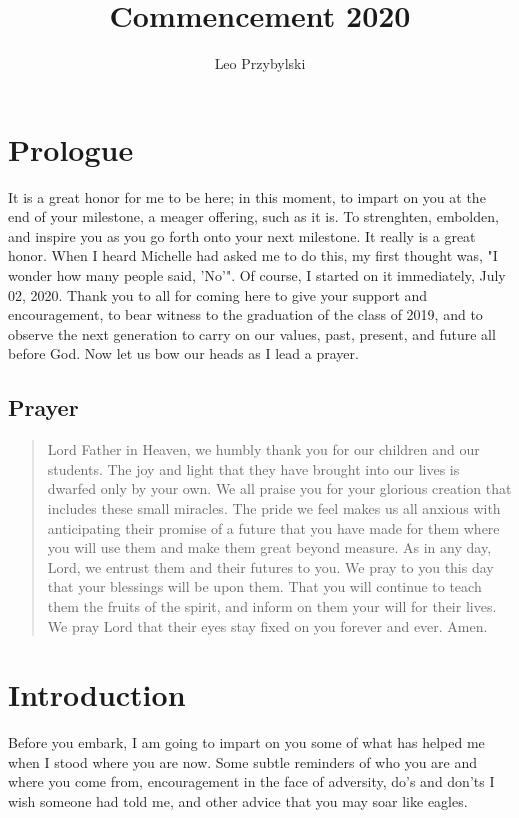 \documentclass[11pt,a4paper,sans]{article}
\title{Commencement 2020}
\author{Leo Przybylski}
\begin{document}
\maketitle
\tableofcontents
\section{Prologue}

It is a great honor for me to be here; in this moment, to impart on you at the end of your milestone, a meager offering, such as it is. To strenghten, embolden, and inspire you as you go forth onto your next milestone. It really is a great honor. When I heard Michelle had asked me to do this, my first thought was, "I wonder how many people said, 'No'". Of course, I started on it immediately, July 02, 2020. Thank you to all for coming here to give your support and encouragement, to bear witness to the graduation of the class of 2019, and to observe the next generation to carry on our values, past, present, and future all before God. Now let us bow our heads as I lead a prayer.

\subsection{Prayer}
\begin{quote}
    Lord Father in Heaven, we humbly thank you for our children and our students. The joy and light that they have brought into our lives is dwarfed only by your own. We all praise you for your glorious creation that includes these small miracles. The pride we feel makes us all anxious with anticipating their promise of a future that you have made for them where you will use them and make them great beyond measure. As in any day, Lord, we entrust them and their futures to you. We pray to you this day that your blessings will be upon them. That you will continue to teach them the fruits of the spirit, and inform on them your will for their lives. We pray Lord that their eyes stay fixed on you forever and ever. Amen.
\end{quote}

\section{Introduction}

Before you embark, I am going to impart on you some of what has helped me when I stood where you are now. Some subtle reminders of who you are and where you come from, encouragement in the face of adversity, do's and don'ts I wish someone had told me, and other advice that you may soar like eagles. 
\end{document}

